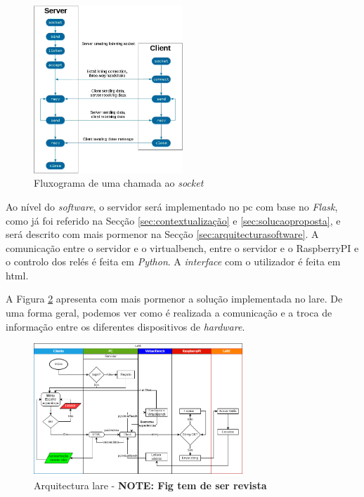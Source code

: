 \begin{figure}[hbtp]
    \centering
    \includegraphics[width=0.5\textwidth]{figures/socketsdiagrama.png}
    \caption{Fluxograma de uma chamada ao \textit{socket} \cite{Sockets}}
    \label{fig:fluxogramasockets}
\end{figure}

Ao nível do \textit{software}, o servidor será implementado no \acrshort{pc} com base no \textit{Flask}, como já foi referido na Secção \ref{sec:contextualização} e \ref{sec:solucaoproposta}, e será descrito com mais pormenor na Secção \ref{sec:arquitecturasoftware}. A comunicação entre o servidor e o \acrshort{virtualbench}, entre o servidor e o \gls{RaspberryPI} e o controlo dos relés é feita em \textit{Python}. A \textit{interface} com o utilizador é feita em \acrshort{html}.

A Figura {\ref{fig:arquitecturalore}} apresenta com mais pormenor a solução implementada no \acrshort{lare}. De uma forma geral, podemos ver como é realizada a comunicação e a troca de informação entre os diferentes dispositivos de \textit{hardware}.

\begin{figure}[hbtp]
    \centering
    \includegraphics[width=0.7\textwidth]{figures/Diagrama_SOFTWARE.drawio.png}
    \caption{Arquitectura \acrshort{lare} - \textbf{NOTE: Fig tem de ser revista}}
    \label{fig:arquitecturalore}
\end{figure}

